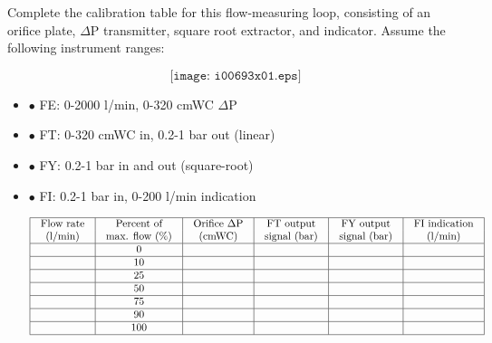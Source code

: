 

Complete the calibration table for this flow-measuring loop, consisting of an orifice plate, $\Delta$P transmitter, square root extractor, and indicator.  Assume the following instrument ranges:

$$\texttt{[image: i00693x01.eps]}$$

\begin{itemize}
\item{$\bullet$} FE: 0-2000 l/min, 0-320 cmWC $\Delta$P
\item{$\bullet$} FT: 0-320 cmWC in, 0.2-1 bar out (linear)
\item{$\bullet$} FY: 0.2-1 bar in and out (square-root)
\item{$\bullet$} FI: 0.2-1 bar in, 0-200 l/min indication
\medskip


$$\vbox{\offinterlineskip
\halign{\strut
\vrule \quad\hfil # \ \hfil & 
\vrule \quad\hfil # \ \hfil & 
\vrule \quad\hfil # \ \hfil & 
\vrule \quad\hfil # \ \hfil & 
\vrule \quad\hfil # \ \hfil & 
\vrule \quad\hfil # \ \hfil \vrule \cr
\noalign{\hrule}
%
Flow rate & Percent of & Orifice $\Delta$P & FT output & FY output & FI indication \cr
%
(l/min) & max. flow (\%) & (cmWC) & signal (bar) & signal (bar) & (l/min) \cr
%
\noalign{\hrule}
%
 & 0 &   &   &   &  \cr
%
\noalign{\hrule}
%
  & 10 &   &   &   &  \cr
%
\noalign{\hrule}
%
  & 25 &   &   &   &  \cr
%
\noalign{\hrule}
%
 & 50 &   &   &   &  \cr
%
\noalign{\hrule}
%
  & 75 &   &   &   &  \cr
%
\noalign{\hrule}
%
  & 90 &   &   &   &  \cr
%
\noalign{\hrule}
%
 & 100 &   &   &   &  \cr
%
\noalign{\hrule}
} %
}$$ %









\end{itemize}
